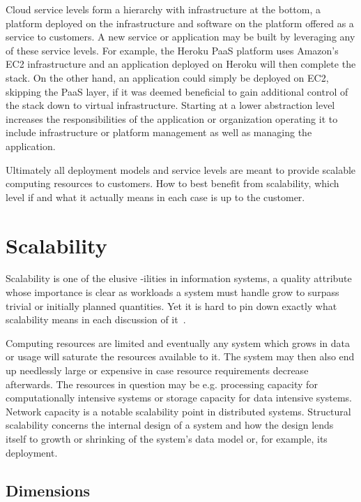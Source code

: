 \documentclass[english]{tktltiki2}
\theoremstyle{definition}
\theoremstyle{remark}
\begin{document}
Cloud service levels form a hierarchy with infrastructure at the bottom, a
platform deployed on the infrastructure and software on the platform offered as
a service to customers. A new service or application may be built by leveraging
any of these service levels. For example, the Heroku PaaS platform uses Amazon’s
EC2 infrastructure and an application deployed on Heroku will then complete the
stack. On the other hand, an application could simply be deployed on EC2,
skipping the PaaS layer, if it was deemed beneficial to gain additional control
of the stack down to virtual infrastructure. Starting at a lower abstraction
level increases the responsibilities of the application or organization
operating it to include infrastructure or platform management as well as
managing the application.

Ultimately all deployment models and service levels are meant to provide
scalable computing resources to customers. How to best benefit from scalability,
which level if  and what it actually means in each case is up to the customer.

\section{Scalability}
\label{sec:scalability}

Scalability is one of the elusive -ilities in information systems, a quality
attribute whose importance is clear as workloads a system must handle grow to
surpass trivial or initially planned quantities. Yet it is hard to pin down
exactly what scalability means in each discussion of
it~\cite{ScalabilityHill1990}.

Computing resources are limited and eventually any system which grows in data or
usage will saturate the resources available to it. The system may then also end
up needlessly large or expensive in case resource requirements decrease
afterwards. The resources in question may be e.g. processing capacity for
computationally intensive systems or storage capacity for data intensive
systems. Network capacity is a notable scalability point in distributed systems.
Structural scalability concerns the internal design of a system and how the
design lends itself to growth or shrinking of the system’s data model or, for
example, its deployment.

\subsection{Dimensions}
\end{document}
